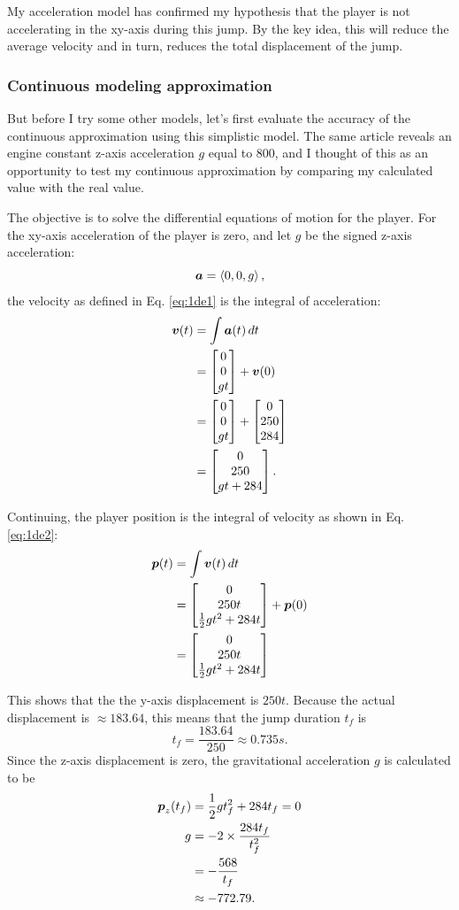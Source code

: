 My acceleration model has confirmed my hypothesis that the player is not accelerating in the xy-axis during this jump. By the key idea, this will reduce the average velocity and in turn, reduces the total displacement of the jump.

\subsubsection{Continuous modeling approximation}
But before I try some other models, let's first evaluate the accuracy of the continuous approximation using this simplistic model. The same article reveals an engine constant z-axis acceleration $g$ equal to $800$, and I thought of this as an opportunity to test my continuous approximation by comparing my calculated value with the real value.

The objective is to solve the differential equations of motion for the player. For the xy-axis acceleration of the player is zero, and let $g$ be the signed z-axis acceleration:
\[
    \boldsymbol{a} = \left\langle 0, 0, g \right\rangle,
\]
the velocity as defined in Eq. \ref{eq:1de1} is the integral of acceleration:
\begin{align*}
    \boldsymbol{v}(t) &= \int \boldsymbol{a}(t) \, dt\\
    &= \begin{bmatrix}0\\0\\gt\end{bmatrix} + \boldsymbol{v}(0)\\
    &= \begin{bmatrix}0\\0\\gt\end{bmatrix} + \begin{bmatrix}0\\250\\284\end{bmatrix}\\
    &= \begin{bmatrix}0\\250\\gt + 284\end{bmatrix}.
\end{align*}

Continuing, the player position is the integral of velocity as shown in Eq. \ref{eq:1de2}:
\begin{align*}
    \boldsymbol{p}(t) &= \int \boldsymbol{v}(t) \, dt\\
    &= \begin{bmatrix}0\\250t\\\frac{1}{2}gt^2 + 284t\end{bmatrix} + \boldsymbol{p}(0)\\
    &= \begin{bmatrix}0\\250t\\\frac{1}{2}gt^2 + 284t\end{bmatrix}
\end{align*}

This shows that the the y-axis displacement is $250t$. Because the actual displacement is $\approx 183.64$, this means that the jump duration $t_f$ is
\[
    t_f = \frac{183.64}{250} \approx 0.735 \si{s}.
\]
Since the z-axis displacement is zero, the gravitational acceleration $g$ is calculated to be
\begin{align*}
    \boldsymbol{p}_{z}(t_f) &= \frac{1}{2}gt_f^2 + 284t_f = 0\\
    g &= - 2 \times \frac{284t_f}{t_f^2}\\
    &= -\frac{568}{t_f}\\
    &\approx -772.79.
\end{align*}

